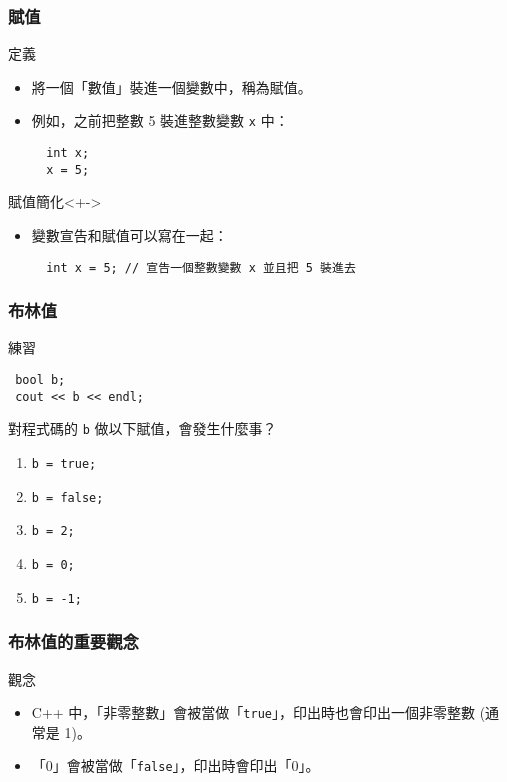 \documentclass[utf8]{beamer}
\begin{document}
\begin{CJK}{UTF8}{bkai}
\begin{frame}[fragile]
  \frametitle{賦值}
  \begin{block}{定義}
    \begin{itemize}[<+->]
    \item 將一個「數值」裝進一個變數中，稱為\alert{賦值}。
    \item 例如，之前把整數 5 裝進整數變數 \lstinline{x} 中：
      \begin{lstlisting}
  int x;
  x = 5;
      \end{lstlisting}
    \end{itemize}
  \end{block}
  \begin{exampleblock}{賦值簡化}<+->
    \begin{itemize}
    \item 變數宣告和賦值可以寫在一起：
      \begin{lstlisting}
  int x = 5; // 宣告一個整數變數 x 並且把 5 裝進去
      \end{lstlisting}
    \end{itemize}
  \end{exampleblock}
\end{frame}

\begin{frame}[fragile]
  \frametitle{布林值}
  \begin{block}{練習}
    \begin{lstlisting}
 bool b;
 cout << b << endl;
    \end{lstlisting}
    對程式碼的 \lstinline{b} 做以下賦值，會發生什麼事？
    \begin{enumerate}
    \item<2-> \lstinline{b = true;}
    \item<3-> \lstinline{b = false;}
    \item<4-> \lstinline{b = 2;}
    \item<5-> \lstinline{b = 0;}
    \item<6-> \lstinline{b = -1;}
    \end{enumerate}
  \end{block}
\end{frame}

\begin{frame}[fragile]
  \frametitle{布林值的重要觀念}
  \begin{alertblock}{觀念}
    \begin{itemize}
    \item C++ 中，「\alert{非零整數}」會被當做「\lstinline{true}」，印出時也會印出一個非零整數 (\alert{通常是 1})。
    \item<2-> 「0」會被當做「\lstinline{false}」，印出時會印出「\alert{0}」。
    \end{itemize}
  \end{alertblock}
\end{frame}


\end{CJK}
\end{document}
